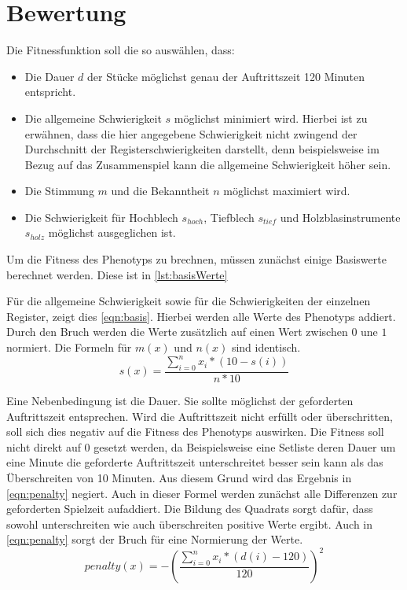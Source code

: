\section{Bewertung}\label{sec:fitness}
Die Fitnessfunktion soll die so auswählen, dass:
\begin{itemize}
    \item Die Dauer $d$ der Stücke möglichst genau der Auftrittszeit 120 Minuten entspricht.
    \item Die allgemeine Schwierigkeit $s$ möglichst minimiert wird. Hierbei ist zu erwähnen, dass die hier
        angegebene Schwierigkeit nicht zwingend der Durchschnitt der Registerschwierigkeiten darstellt, denn
        beispielsweise im Bezug auf das Zusammenspiel kann die allgemeine Schwierigkeit höher sein.
    \item Die Stimmung $m$ und die Bekanntheit $n$ möglichst maximiert wird.
    \item Die Schwierigkeit für Hochblech $s_{hoch}$, Tiefblech $s_{tief}$ und Holzblasinstrumente $s_{holz}$ möglichst ausgeglichen ist.
\end{itemize}
Um die Fitness des Phenotyps zu brechnen, müssen zunächst einige Basiswerte berechnet werden. Diese ist in \autoref{lst:basisWerte}

Für die allgemeine Schwierigkeit sowie für die Schwierigkeiten der einzelnen Register, zeigt dies \autoref{eqn:basis}. Hierbei werden alle Werte des
Phenotyps addiert. Durch den Bruch werden die Werte zusätzlich auf einen Wert zwischen $0$ une $1$ normiert.
Die Formeln für $m(x)$ und $n(x)$ sind identisch.
\begin{equation}
    s(x) = \frac{\sum_{i=0}^{n} x_i * (10 - s(i)) }{n * 10}
    \label{eqn:basis}
\end{equation}

Eine Nebenbedingung ist die Dauer. Sie sollte möglichst der geforderten Auftrittszeit entsprechen. Wird die Auftrittszeit nicht erfüllt
oder überschritten, soll sich dies negativ auf die Fitness des Phenotyps auswirken. Die Fitness soll nicht direkt auf 0 gesetzt werden, da
Beispielsweise eine Setliste deren Dauer um eine Minute die geforderte Auftrittszeit unterschreitet besser sein kann als das Überschreiten von 10 Minuten.
Aus diesem Grund wird das
Ergebnis in \autoref{eqn:penalty} negiert. Auch in dieser Formel werden zunächst alle Differenzen zur geforderten
Spielzeit aufaddiert. Die Bildung des Quadrats sorgt dafür, dass sowohl unterschreiten wie auch überschreiten
positive Werte ergibt.
Auch in \autoref{eqn:penalty} sorgt der Bruch für eine Normierung der Werte.
\begin{equation}
    penalty(x) = -\left( \frac{\sum_{i=0}^{n}x_i * (d(i)-120)}{120}\right)^2
    \label{eqn:penalty}
\end{equation}

